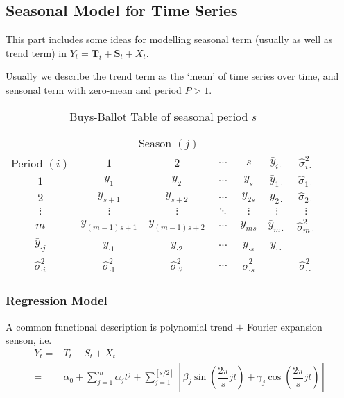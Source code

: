     
\subsection{Seasonal Model for Time Series}
    This part includes some ideas for modelling seasonal term (usually as well as trend term) in $ Y_t=\mathbf{T}_t+\mathbf{S}_t+X_t $.

    Usually we describe the trend term as the `mean' of time series over time, and sensonal term with zero-mean and period $ P>1 $.




\begin{table}[H]
    \centering
    \renewcommand\arraystretch{1}
    \caption{Buys-Ballot Table of seasonal period $ s $}
    \begin{tabular}{ccccc|cc}
        \hline
        \hline
        &\multicolumn{4}{c|}{Season $ (j) $}&&\\
        \cline{2-5}
        Period $ (i) $&$ 1 $&$ 2 $&$ \ldots $&$ s $&$ \bar{y}_{i\cdot} $&$ \hat{\sigma }^2_{i\cdot} $\\
        \hline
        $ 1 $&$ y_{1} $&$ y_2 $&$ \ldots $&$ y_s $&$ \bar{y}_{1\cdot} $&$ \hat{\sigma }_{1\cdot} $\\
        $ 2 $&$ y_{s+1} $&$ y_{s+2} $&$ \ldots $&$ y_{2s} $&$ \bar{y}_{2\cdot} $&$ \hat{\sigma }_{2\cdot} $\\
        $ \vdots $&$ \vdots $&$ \vdots $&$ \ddots $&$ \vdots $&$ \vdots $&$ \vdots $\\
        $ m $&$ y_{(m-1)s+1} $&$ y_{(m-1)s+2} $&$ \ldots $&$ y_{ms } $&$ \bar{y}_{m\cdot} $&$ \hat{\sigma }^2_{m\cdot} $\\
        \hline
        $ \bar{y}_{\cdot j} $&$ \bar{y}_{\cdot 1} $&$ \bar{y}_{\cdot 2} $&$ \ldots $&$ \bar{y}_{\cdot s} $&$ \bar{y}_{\cdot\cdot} $&-\\
        $ \hat{\sigma }^2_{\cdot i} $&$ \hat{\sigma }^2_{\cdot 1} $&$ \hat{\sigma }^2_{\cdot 2} $&$ \ldots $&$ \hat{\sigma }^2_{\cdot s} $&-&$ \hat{\sigma }^2_{\cdot \cdot} $\\
        \hline
        \hline
    \end{tabular}
    \label{}
\end{table}



\subsubsection{Regression Model}
    A common functional description is polynomial trend $ + $ Fourier expansion senson, i.e.
    \begin{align}
        Y_t=&T_t+S_t+X_t\\
        =&\alpha _0+\sum_{j=1}^m\alpha _jt^j+\sum_{j=1}^{[s/2]}\left[\beta _j\sin(\dfrac{2\pi }{s}jt)+\gamma _j\cos(\dfrac{2\pi}{s}jt)\right]
    \end{align}

